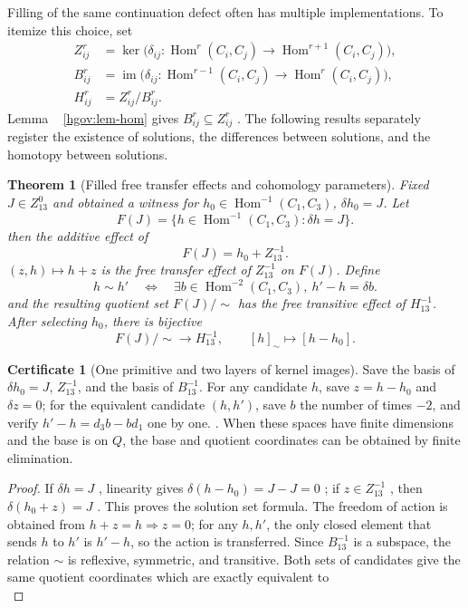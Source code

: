 \documentclass[12pt,a4paper,openany,notitlepage]{report}
\theoremstyle{plain}
\newtheorem{theorem}{Theorem}[chapter]
\theoremstyle{definition}
\newtheorem*{certificate}{Certificate}
\theoremstyle{remark}
\def\mathcal#1{#1}\def\mathsf#1{#1}\def\mathbb#1{#1}%
\begin{document}
\begin{CJK*}
Filling of the same continuation defect often has multiple implementations. To itemize this choice, set \[
 \begin{aligned}
 Z^r_{ij}
 &=\ker\bigl(\delta_{ij}:
       \operatorname{Hom}^r(C_i,C_j)\to
       \operatorname{Hom}^{r+1}(C_i,C_j)\bigr),\\
 B^r_{ij}
 &=\operatorname{im}\bigl(\delta_{ij}:
       \operatorname{Hom}^{r-1}(C_i,C_j)\to
       \operatorname{Hom}^{r}(C_i,C_j)\bigr),\\
 H^r_{ij}&=Z^r_{ij}/B^r_{ij}.
 \end{aligned}
\] Lemma ~ \ref{hgov:lem-hom} gives $B^r_{ij}\subseteq Z^r_{ij}$ . The following results separately register the existence of solutions, the differences between solutions, and the homotopy between solutions.

\begin{theorem}
[Filled free transfer effects and cohomology parameters]\label{exp:hom:filler-torsor}
Fixed $J\in Z^0_{13}$ and obtained a witness for $h_0\in\operatorname{Hom}^{-1}(C_1,C_3)$, $\delta h_0=J$. Let \[
 \mathcal F(J)
 =\{h\in\operatorname{Hom}^{-1}(C_1,C_3):\delta h=J\}.
\] then the additive effect of \[
 \mathcal F(J)=h_0+Z^{-1}_{13}.
\] $(z,h)\mapsto h+z$ is the free transfer effect of $Z^{-1}_{13}$ on $\mathcal F(J)$. Define \[
 h\sim h'
 \quad\Longleftrightarrow\quad
 \exists b\in\operatorname{Hom}^{-2}(C_1,C_3),\
 h'-h=\delta b.
\] and the resulting quotient set $\mathcal F(J)/{\sim}$ has the free transitive effect of $H^{-1}_{13}$. After selecting $h_0$, there is bijective \[
 \mathcal F(J)/{\sim}\longrightarrow H^{-1}_{13},
 \qquad [h]_{\sim}\longmapsto[h-h_0].
\]\end{theorem}
\begin{certificate}
[One primitive and two layers of kernel images]Save the basis of $\delta h_0=J$, $Z^{-1}_{13}$, and the basis of $B^{-1}_{13}$. For any candidate $h$, save $z=h-h_0$ and $\delta z=0$; for the equivalent candidate $(h,h')$, save $b$ the number of times $-2$, and verify $h'-h=d_3b-bd_1$ one by one. . When these spaces have finite dimensions and the base is on $\mathbb Q$, the base and quotient coordinates can be obtained by finite elimination.\end{certificate}
\begin{proof}
If $\delta h=J$ , linearity gives $\delta(h-h_0)=J-J=0$ ; if $z\in Z^{-1}_{13}$ , then $\delta(h_0+z)=J$ . This proves the solution set formula. The freedom of action is obtained from $h+z=h\Rightarrow z=0$; for any $h,h'$, the only closed element that sends $h$ to $h'$ is $h'-h$, so the action is transferred. Since $B^{-1}_{13}$ is a subspace, the relation $\sim$ is reflexive, symmetric, and transitive. Both sets of candidates give the same quotient coordinates which are exactly equivalent to \[
\]
\end{proof}
\end{CJK*}
\end{document}
